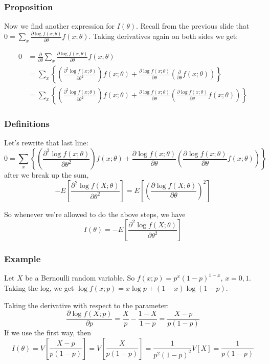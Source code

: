 \documentclass{beamer}
\begin{document}
\begin{frame}
\frametitle{Proposition}

Now we find another expression for $I(\theta)$. Recall from the previous slide that $0 = \sum_{x} \frac{\partial \log f(x;\theta)}{ \partial \theta} f(x; \theta)$. Taking derivatives again on both sides we get:

\begin{align*}
0 &= \frac{\partial}{\partial \theta}\sum_{x} \frac{\partial \log f(x;\theta)}{ \partial \theta} f(x; \theta) \\
&=  \sum_{x} \left\{\left( \frac{\partial^2 \log f(x;\theta)}{ \partial \theta^2} \right) f(x; \theta) + \frac{\partial \log f(x;\theta)}{ \partial \theta} \left(\frac{\partial}{\partial \theta}f(x; \theta) \right) \right\} \\
&=  \sum_{x} \left\{\left( \frac{\partial^2 \log f(x;\theta)}{ \partial \theta^2} \right) f(x; \theta) + \frac{\partial \log f(x;\theta)}{ \partial \theta} \left(\frac{\partial \log f(x;\theta)}{ \partial \theta} f(x;\theta) \right)\right\}
\end{align*}

\end{frame}


\begin{frame}
\frametitle{Definitions}

Let's rewrite that last line:
\[
0 = \sum_{x} \left\{\left( \frac{\partial^2 \log f(x;\theta)}{ \partial \theta^2} \right) f(x; \theta) + \frac{\partial \log f(x;\theta)}{ \partial \theta} \left(\frac{\partial \log f(x;\theta)}{ \partial \theta} f(x;\theta) \right)\right\}
\]
after we break up the sum, 
\[
 - E \left[ \frac{\partial^2 \log f(X;\theta)}{ \partial \theta^2} \right] = E\left[ \left(\frac{\partial \log f(X;\theta)}{ \partial \theta} \right)^2 \right]
\]

So whenever we're allowed to do the above steps, we have
\[
I(\theta) = - E \left[ \frac{\partial^2 \log f(X;\theta)}{ \partial \theta^2} \right]
\]
\end{frame}


\begin{frame}
\frametitle{Example}

Let $X$ be a Bernoulli random variable. So $f(x;p) = p^x(1-p)^{1-x}$, $x=0,1$. Taking the log, we get $\log f(x;p) = x\log p + (1-x) \log (1-p)$.
\newline

Taking the derivative with respect to the parameter:
\[
\frac{\partial \log f(X;p)}{\partial p} = \frac{X}{p} - \frac{1-X}{1-p} = \frac{X - p}{p(1-p)}
\]
If we use the first way, then
\[
I(\theta) = V \left[\frac{X - p}{p(1-p)}  \right] = V \left[\frac{X }{p(1-p)}  \right] = \frac{1}{p^2(1-p)^2}V \left[ X  \right] = \frac{1}{p(1-p)} 
\]
\end{frame}
\end{document}
